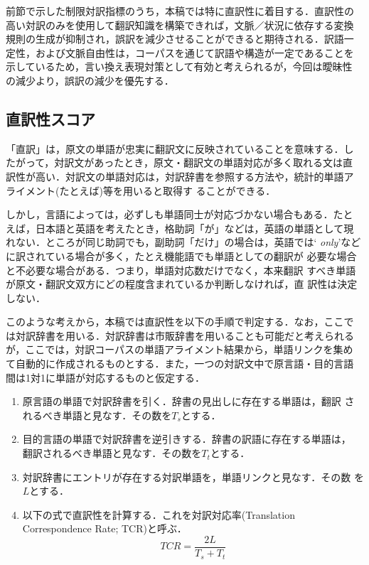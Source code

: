 前節で示した制限対訳指標のうち，本稿では特に直訳性に着目する．直訳性の
高い対訳のみを使用して翻訳知識を構築できれば，文脈／状況に依存する変換
規則の生成が抑制され，誤訳を減少させることができると期待される．訳語一
定性，および文脈自由性は，コーパスを通じて訳語や構造が一定であることを
示しているため，言い換え表現対策として有効と考えられるが，今回は曖昧性
の減少より，誤訳の減少を優先する．

\subsection{直訳性スコア}
\label{sec-literalness-score}

「直訳」は，原文の単語が忠実に翻訳文に反映されていることを意味する．し
たがって，対訳文があったとき，原文・翻訳文の単語対応が多く取れる文は直
訳性が高い．対訳文の単語対応は，対訳辞書を参照する方法や，統計的単語ア
ライメント(たとえば\cite{Melamed:WordAlignment2000})等を用いると取得す
ることができる．

しかし，言語によっては，必ずしも単語同士が対応づかない場合もある．たと
えば，日本語と英語を考えたとき，格助詞「が」などは，英語の単語として現
れない．ところが同じ助詞でも，副助詞「だけ」の場合は，英語では`{\it
only}'などに訳されている場合が多く，たとえ機能語でも単語としての翻訳が
必要な場合と不必要な場合がある．つまり，単語対応数だけでなく，本来翻訳
すべき単語が原文・翻訳文双方にどの程度含まれているか判断しなければ，直
訳性は決定しない．

このような考えから，本稿では直訳性を以下の手順で判定する．なお，ここで
は対訳辞書を用いる．対訳辞書は市販辞書を用いることも可能だと考えられる
が，ここでは，対訳コーパスの単語アライメント結果から，単語リンクを集め
て自動的に作成されるものとする．また，一つの対訳文中で原言語・目的言語
間は1対1に単語が対応するものと仮定する．

\begin{enumerate}
\item 原言語の単語で対訳辞書を引く．辞書の見出しに存在する単語は，翻訳
されるべき単語と見なす．その数を$T_s$とする．
\item 目的言語の単語で対訳辞書を逆引きする．辞書の訳語に存在する単語は，
翻訳されるべき単語と見なす．その数を$T_t$とする．
\item 対訳辞書にエントリが存在する対訳単語を，単語リンクと見なす．その数
を$L$とする．
\item 以下の式で直訳性を計算する．これを対訳対応率(Translation
Correspondence Rate; TCR)と呼ぶ．
  \begin{equation}
  TCR = \frac{2L}{T_s + T_t}\label{eqn-tcr}
  \end{equation}
\end{enumerate}

